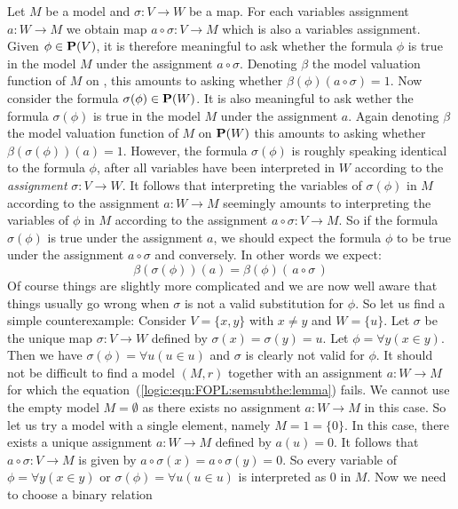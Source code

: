 Let $M$ be a model and $\sigma:V\to W$ be a map. For each variables
assignment $a:W\to M$ we obtain map $a\circ \sigma:V\to M$ which is
also a variables assignment. Given $\phi\in\mbox{${\bf P}(V)$}$, it is therefore
meaningful to ask whether the formula $\phi$ is true in the model
$M$ under the assignment $a\circ\sigma$. Denoting $\beta$ the model
valuation function of $M$ on \pv, this amounts to asking whether
$\beta(\phi)(a\circ\sigma)=1$. Now consider the formula
$\sigma(\phi)\in{\bf P}(W)$. It is also meaningful to ask wether the
formula $\sigma(\phi)$ is true in the model $M$ under the assignment
$a$. Again denoting $\beta$ the model valuation function of $M$ on
${\bf P}(W)$ this amounts to asking whether
$\beta(\sigma(\phi))(a)=1$. However, the formula $\sigma(\phi)$ is
roughly speaking identical to the formula $\phi$, after all
variables have been interpreted in $W$ according to the {\em
assignment} $\sigma:V\to W$. It follows that interpreting the
variables of $\sigma(\phi)$ in $M$ according to the assignment
$a:W\to M$ seemingly amounts to interpreting the variables of $\phi$
in $M$ according to the assignment $a\circ\sigma:V\to M$. So if the
formula $\sigma(\phi)$ is true under the assignment $a$, we should
expect the formula $\phi$ to be true under the assignment
$a\circ\sigma$ and conversely. In other words we expect:
    \begin{equation}\label{logic:eqn:FOPL:semsubthe:lemma}
    \beta(\sigma(\phi))(a)=\beta(\phi)(\,a\circ\sigma\,)
    \end{equation}
Of course things are slightly more complicated and we are now well
aware that things usually go wrong when $\sigma$ is not a valid
substitution for $\phi$. So let us find a simple counterexample:
Consider $V=\{x,y\}$ with $x\neq y$ and $W=\{u\}$. Let $\sigma$ be
the unique map $\sigma:V\to W$ defined by $\sigma(x)=\sigma(y)=u$.
Let $\phi=\forall y(x\in y)$. Then we have $\sigma(\phi)=\forall
u(u\in u)$ and $\sigma$ is clearly not valid for $\phi$. It should
not be difficult to find a model $(M,r)$ together with an assignment
$a:W\to M$ for which the
equation~(\ref{logic:eqn:FOPL:semsubthe:lemma}) fails. We cannot use
the empty model $M=\emptyset$ as there exists no assignment $a:W\to
M$ in this case. So let us try a model with a single element, namely
$M=1=\{0\}$. In this case, there exists a unique assignment $a:W\to
M$ defined by $a(u)=0$. It follows that $a\circ\sigma:V\to M$ is
given by $a\circ\sigma(x)=a\circ\sigma(y)=0$. So every variable of
$\phi=\forall y(x\in y)$ or $\sigma(\phi)=\forall u(u\in u)$ is
interpreted as $0$ in $M$. Now we need to choose a binary relation
